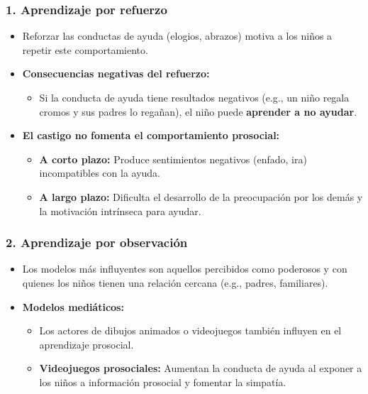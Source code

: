 \documentclass[
]{book}
\providecommand{\tightlist}{%
  \setlength{\itemsep}{0pt}\setlength{\parskip}{0pt}}
\begin{document}
\subsubsection{1. Aprendizaje por refuerzo}\label{aprendizaje-por-refuerzo}

\begin{itemize}
\tightlist
\item
  Reforzar las conductas de ayuda (elogios, abrazos) motiva a los niños a repetir este comportamiento.
\item
  \textbf{Consecuencias negativas del refuerzo:}

  \begin{itemize}
  \tightlist
  \item
    Si la conducta de ayuda tiene resultados negativos (e.g., un niño regala cromos y sus padres lo regañan), el niño puede \textbf{aprender a no ayudar}.
  \end{itemize}
\item
  \textbf{El castigo no fomenta el comportamiento prosocial:}

  \begin{itemize}
  \tightlist
  \item
    \textbf{A corto plazo:} Produce sentimientos negativos (enfado, ira) incompatibles con la ayuda.
  \item
    \textbf{A largo plazo:} Dificulta el desarrollo de la preocupación por los demás y la motivación intrínseca para ayudar.
  \end{itemize}
\end{itemize}

\subsubsection{2. Aprendizaje por observación}\label{aprendizaje-por-observaciuxf3n}

\begin{itemize}
\tightlist
\item
  Los modelos más influyentes son aquellos percibidos como poderosos y con quienes los niños tienen una relación cercana (e.g., padres, familiares).
\item
  \textbf{Modelos mediáticos:}

  \begin{itemize}
  \tightlist
  \item
    Los actores de dibujos animados o videojuegos también influyen en el aprendizaje prosocial.
  \item
    \textbf{Videojuegos prosociales:} Aumentan la conducta de ayuda al exponer a los niños a información prosocial y fomentar la simpatía.
  \end{itemize}
\end{itemize}
\end{document}
